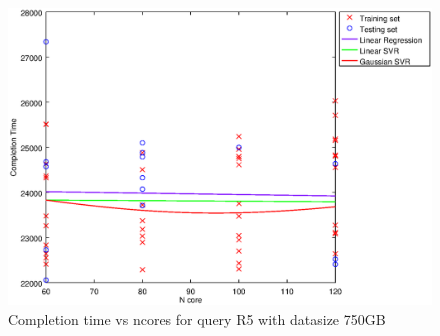 
\begin {figure}[hbtp]
\centering
\includegraphics[width=\textwidth]{output/R5_750_LINEAR_NCORE/plot_R5_750_bestmodels.eps}
\caption{Completion time vs ncores for query R5 with datasize 750GB}
\label{fig:coreonly_linear_R5_750}
\end {figure}
